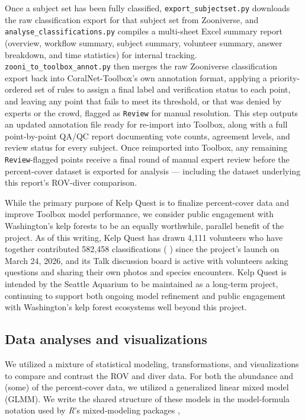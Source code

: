 \documentclass[11pt]{article}
\newcommand{\boxedref}[2]{%
	\begingroup
	\setlength{\fboxrule}{0.8pt}%
	\setlength{\fboxsep}{1.5pt}%
	\textcolor{linkcyan}{%
		\fbox{%
			\textcolor{black}{%
				\hyperref[#2]{#1~\ref*{#2}}%
			}%
		}%
	}%
	\endgroup
}
\newcommand{\figref}[1]{\boxedref{Fig.}{#1}}\newcommand{\tabref}[1]{\boxedref{Table}{#1}}
\begin{document}
Once a subject set has been fully classified, \texttt{export\_subjectset.py} 
downloads the raw classification export for that subject set from Zooniverse, 
and \texttt{analyse\_classifications.py} compiles a multi-sheet Excel summary 
report (overview, workflow summary, subject summary, volunteer summary, answer 
breakdown, and time statistics) for internal tracking.
\texttt{zooni\_to\_toolbox\_annot.py} then merges the raw Zooniverse 
classification export back into CoralNet-Toolbox's own annotation format, 
applying a priority-ordered set of rules to assign a final label and 
verification status to each point, and leaving any point that fails 
to meet its threshold, or that was denied by experts or the crowd, flagged as 
\texttt{Review} for manual resolution.
This step outputs an updated annotation file ready for re-import into Toolbox, 
along with a full point-by-point QA/QC report documenting vote counts, 
agreement levels, and review status for every subject.
Once reimported into Toolbox, any remaining \texttt{Review}-flagged points 
receive a final round of manual expert review before the percent-cover dataset 
is exported for analysis --- including the dataset underlying this report's 
ROV-diver comparison.

While the primary purpose of Kelp Quest is to finalize percent-cover data and 
improve Toolbox model performance, we consider public engagement with 
Washington's kelp forests to be an equally worthwhile, parallel benefit of the 
project.
As of this writing, Kelp Quest has drawn 4{,}111 volunteers who have together
contributed 582{,}458 classifications (\figref{fig:kelpquest_volume}) since the 
project's launch on March 24, 2026, and its Talk discussion board is active 
with volunteers asking questions and sharing their own photos and species 
encounters.
Kelp Quest is intended by the Seattle Aquarium to be maintained as a long-term 
project, continuing to support both ongoing model refinement and public 
engagement with Washington's kelp forest ecosystems well beyond this project.

\subsection{Data analyses and visualizations}
\label{subsec:analyses}

We utilized a mixture of statistical modeling, transformations, and
visualizations to compare and contrast the ROV and diver data.
For both the abundance and (some) of the percent-cover data, we utilized a
generalized linear mixed model (GLMM).
We write the shared structure of these models in the model-formula notation
used by \textit{R}'s mixed-modeling packages \citep{Bates:2015aa, 
Brooks:2017aa},
\end{document}
